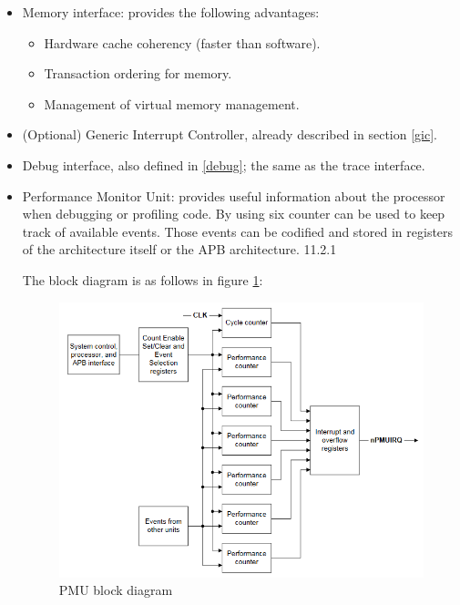 \begin{itemize}
	\item { Memory interface: provides the following advantages: 
		\begin{itemize}
			\item Hardware cache coherency (faster than software).
			\item Transaction ordering for memory.
			\item Management of virtual memory management.
		\end{itemize}
 }
	\item { (Optional) Generic Interrupt Controller, already described in section \ref{gic}.}
	\item { Debug interface, also defined in \ref{debug}; the same as the trace interface. }
	\item { Performance Monitor Unit: provides useful information about the processor when debugging or profiling code. By using six counter can be used to keep track of available events. Those events can be codified and stored in registers of the architecture itself or the APB architecture. \cite{cortexA72manual} 11.2.1
	
	The block diagram is as follows in figure \ref{eventsblock}: 
	
	\begin{figure}[H]
		\centering
		\includegraphics[width=0.7\linewidth]{imgs/eventsblock}
		\caption[]{PMU block diagram}
		\label{eventsblock}
	\end{figure}
}
\end{itemize}